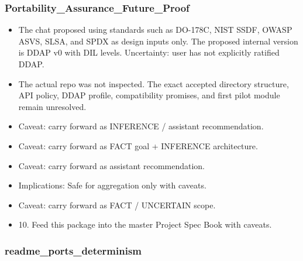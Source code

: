 \documentclass[11pt,a4paper]{report}
\begin{document}
\subsubsection{Portability\_Assurance\_Future\_Proof}

\begin{itemize}
\item The chat proposed using standards such as DO-178C, NIST SSDF, OWASP ASVS, SLSA, and SPDX as design inputs only. The proposed internal version is DDAP v0 with DIL levels. Uncertainty: user has not explicitly ratified DDAP.
\item The actual repo was not inspected. The exact accepted directory structure, API policy, DDAP profile, compatibility promises, and first pilot module remain unresolved.
\item Caveat: carry forward as INFERENCE / assistant recommendation.
\item Caveat: carry forward as FACT goal + INFERENCE architecture.
\item Caveat: carry forward as assistant recommendation.
\item Implications: Safe for aggregation only with caveats.
\item Caveat: carry forward as FACT / UNCERTAIN scope.
\item 10. Feed this package into the master Project Spec Book with caveats.
\end{itemize}

\subsubsection{readme\_ports\_determinism}
\end{document}
